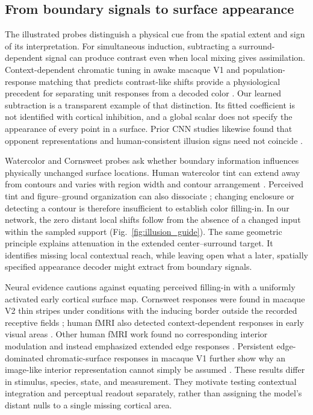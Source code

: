 \documentclass[authoryear,preprint,review,12pt]{elsarticle}
\begin{document}
\subsection{From boundary signals to surface appearance}
The illustrated probes distinguish a physical cue from the spatial extent and sign of its interpretation. For simultaneous induction, subtracting a surround-dependent signal can produce contrast even when local mixing gives assimilation. Context-dependent chromatic tuning in awake macaque V1 and population-response matching that predicts contrast-like shifts provide a physiological precedent for separating unit responses from a decoded color \citep{wachtler2003}. Our learned subtraction is a transparent example of that distinction. Its fitted coefficient is not identified with cortical inhibition, and a global scalar does not specify the appearance of every point in a surface. Prior CNN studies likewise found that opponent representations and human-consistent illusion signs need not coincide \citep{gomezvilla2019deceived,gomezvilla2020color}.

Watercolor and Cornsweet probes ask whether boundary information influences physically unchanged surface locations. Human watercolor tint can extend away from contours and varies with region width and contour arrangement \citep{devinck2006watercolor,kimura2014watercolor}. Perceived tint and figure--ground organization can also dissociate \citep{vonderheydt2006watercolor}; changing enclosure or detecting a contour is therefore insufficient to establish color filling-in. In our network, the zero distant local shifts follow from the absence of a changed input within the sampled support (Fig.~\ref{fig:illusion_guide}). The same geometric principle explains attenuation in the extended center--surround target. It identifies missing local contextual reach, while leaving open what a later, spatially specified appearance decoder might extract from boundary signals.

Neural evidence cautions against equating perceived filling-in with a uniformly activated early cortical surface map. Cornsweet responses were found in macaque V2 thin stripes under conditions with the inducing border outside the recorded receptive fields \citep{roe2005brightness}; human fMRI also detected context-dependent responses in early visual areas \citep{boyaci2007lightness}. Other human fMRI work found no corresponding interior modulation and instead emphasized extended edge responses \citep{cornelissen2006filling}. Persistent edge-dominated chromatic-surface responses in macaque V1 further show why an image-like interior representation cannot simply be assumed \citep{zweig2015surfaces}. These results differ in stimulus, species, state, and measurement. They motivate testing contextual integration and perceptual readout separately, rather than assigning the model's distant nulls to a single missing cortical area.
\end{document}
